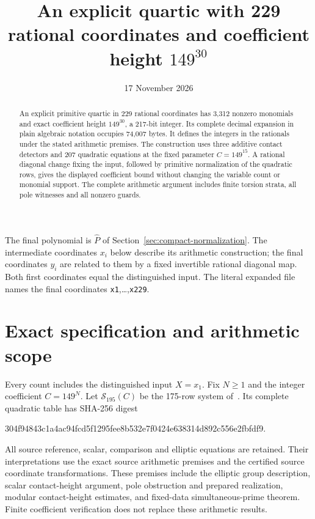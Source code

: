 \documentclass[11pt,a4paper]{article}
\title{An explicit quartic with 229 rational coordinates and coefficient height \texorpdfstring{$149^{30}$}{149 to the power 30}}
\author{}\date{17 November 2026}
\begin{document}
\maketitle

\begin{abstract}
An explicit primitive quartic in 229 rational coordinates has 3,312
nonzero monomials and exact coefficient height $149^{30}$, a 217-bit
integer. Its complete decimal expansion in plain algebraic notation
occupies 74,007 bytes. It defines the integers in the rationals under
the stated arithmetic premises. The construction uses three additive
contact detectors and 207 quadratic equations at the fixed parameter
$C=149^{15}$. A rational diagonal change fixing the input, followed by
primitive normalization of the quadratic rows, gives the displayed
coefficient bound without changing the variable count or monomial
support. The complete arithmetic argument includes finite torsion
strata, all pole witnesses and all nonzero guards.
\end{abstract}


The final polynomial is $\widehat P$ of
Section~\ref{sec:compact-normalization}. The intermediate coordinates
$x_i$ below describe its arithmetic construction; the final coordinates
$y_i$ are related to them by a fixed invertible rational diagonal map.
Both first coordinates equal the distinguished input. The literal
expanded file names the final coordinates \texttt{x1},\ldots,\texttt{x229}.

\section{Exact specification and arithmetic scope}

Every count includes the distinguished input $X=x_1$.
Fix $N\ge1$ and the integer coefficient $C=149^N$.
Let $\mathcal S_{195}(C)$ be the 175-row system of~\cite{Parent195}.
Its complete quadratic table has SHA-256 digest
\begin{center}\small\ttfamily
304f94843c1a4ac94fcd5f1295fee8b532e7f0424e638314d892c556e2fbfdf9.
\end{center}
All source reference, scalar, comparison and elliptic equations are
retained. Their interpretations use the exact source arithmetic
premises and the certified source coordinate transformations.
These premises include the elliptic group description, scalar
contact-height argument, pole obstruction and prepared realization,
modular contact-height estimates, and fixed-data simultaneous-prime
theorem. Finite coefficient verification does not replace these
arithmetic results.
\end{document}
